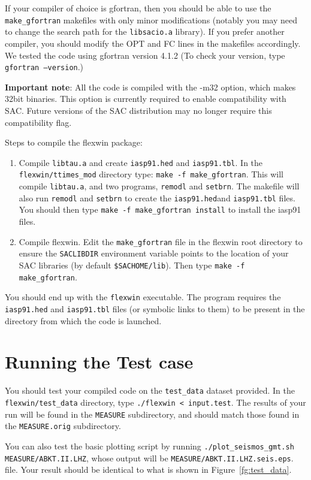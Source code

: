 If your compiler of choice is gfortran, then you should be able to use the
{\tt make\_gfortran} makefiles with only minor modifications (notably you may need to
change the search path for the {\tt libsacio.a} library).  If you prefer another
compiler, you should modify the OPT and FC lines in the makefiles accordingly. We tested the code using gfortran version 4.1.2
(To check your version, type {\tt gfortran --version}.)  

{\bf Important note}: All the code is compiled with the -m32 option, which makes
32bit binaries.  This option is currently required to enable compatibility with
SAC.  Future versions of the SAC distribution may no longer require this
compatibility flag.

Steps to compile the flexwin package:
\begin{enumerate}
\item Compile {\tt libtau.a} and create {\tt iasp91.hed} and {\tt iasp91.tbl}.  In the {\tt flexwin/ttimes\_mod} directory type: {\tt make -f make\_gfortran}.  This will compile {\tt libtau.a}, and two programs, {\tt remodl} and {\tt setbrn}.  The makefile will also run {\tt remodl} and {\tt setbrn} to create the {\tt iasp91.hed}and {\tt iasp91.tbl} files.  You should then type {\tt make -f make\_gfortran install} to install the iasp91 files.
\item Compile flexwin.  Edit the {\tt make\_gfortran} file in the flexwin root directory to ensure the {\tt SACLIBDIR} environment variable points to the location of your SAC libraries (by default {\tt \$SACHOME/lib}).  Then type {\tt make -f make\_gfortran}.
\end{enumerate}

You should end up with the {\tt flexwin} executable.  The program requires the {\tt iasp91.hed} and {\tt iasp91.tbl} files (or symbolic links to them) to be present in the directory from which the code is launched. 


\section{Running the Test case}

You should test your compiled code on the {\tt test\_data} dataset provided.  In the
{\tt flexwin/test\_data} directory, type {\tt ./flexwin < input.test}.  The results of your
run will be found in the {\tt MEASURE} subdirectory, and
should match those found in the {\tt MEASURE.orig}
subdirectory.

You can also test the basic plotting script by running {\tt ./plot\_seismos\_gmt.sh
MEASURE/ABKT.II.LHZ}, whose output will be
{\tt MEASURE/ABKT.II.LHZ.seis.eps}.
file.  Your result should be identical to what is shown in Figure~\ref{fg:test_data}.

